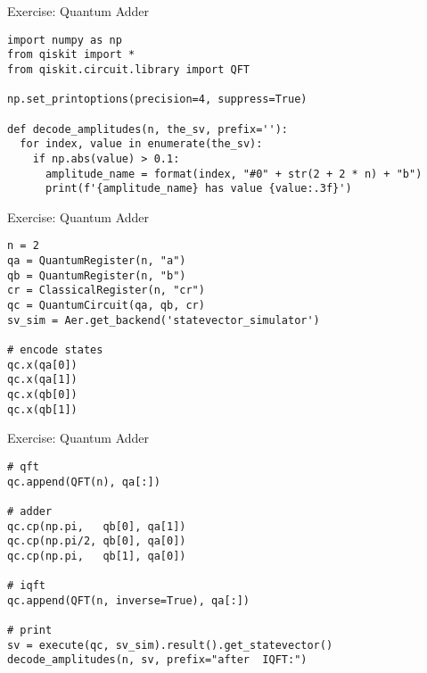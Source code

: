 \begin{frame}[fragile]{Exercise: Quantum Adder}
\begin{verbatim}
import numpy as np
from qiskit import *
from qiskit.circuit.library import QFT

np.set_printoptions(precision=4, suppress=True)

def decode_amplitudes(n, the_sv, prefix=''):
  for index, value in enumerate(the_sv):
    if np.abs(value) > 0.1:
      amplitude_name = format(index, "#0" + str(2 + 2 * n) + "b")
      print(f'{amplitude_name} has value {value:.3f}')
\end{verbatim}
\end{frame}

\begin{frame}[fragile]{Exercise: Quantum Adder}
\begin{verbatim}
n = 2
qa = QuantumRegister(n, "a")
qb = QuantumRegister(n, "b")
cr = ClassicalRegister(n, "cr")
qc = QuantumCircuit(qa, qb, cr)
sv_sim = Aer.get_backend('statevector_simulator')

# encode states
qc.x(qa[0])
qc.x(qa[1])
qc.x(qb[0])
qc.x(qb[1])
\end{verbatim}
\end{frame}

\begin{frame}[fragile]{Exercise: Quantum Adder}
\begin{verbatim}
# qft
qc.append(QFT(n), qa[:])

# adder
qc.cp(np.pi,   qb[0], qa[1])
qc.cp(np.pi/2, qb[0], qa[0])
qc.cp(np.pi,   qb[1], qa[0])

# iqft
qc.append(QFT(n, inverse=True), qa[:])

# print
sv = execute(qc, sv_sim).result().get_statevector()
decode_amplitudes(n, sv, prefix="after  IQFT:")
\end{verbatim}
\end{frame}
